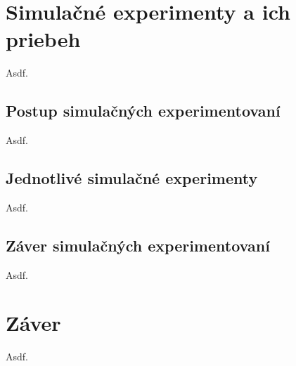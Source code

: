 \documentclass[11pt,a4paper]{article}
\begin{document}
\section{Simulačné experimenty a ich priebeh}

    Asdf.

    \subsection{Postup simulačných experimentovaní}

        Asdf.

    \subsection{Jednotlivé simulačné experimenty}

        Asdf.

    \subsection{Záver simulačných experimentovaní}

        Asdf.

\section{Záver}

    Asdf.



\newpage %

\makeatletter
\makeatother

\begin{flushleft}
    
\end{flushleft}
\end{document}
